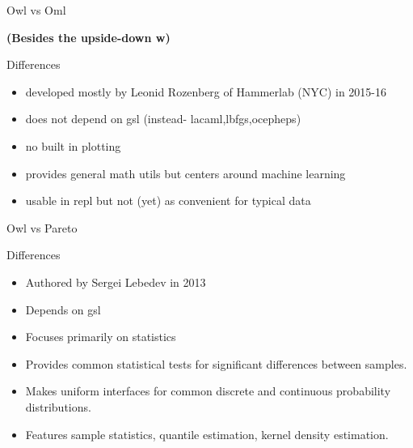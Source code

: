 \documentclass{beamer}
\begin{document}
\begin{frame}{Owl vs Oml}
\begin{block}{\textbf{(Besides the upside-down w)}}

\end{block}
\begin{block}{Differences}
\begin{itemize}
 \item developed mostly by Leonid Rozenberg of Hammerlab (NYC) in 2015-16 
 \item does not depend on gsl (instead- lacaml,lbfgs,ocepheps)
 \item no built in plotting
 \item provides general math utils but centers around machine learning
 \item usable in repl but not (yet) as convenient for typical data
\end{itemize}
\end{block}
\end{frame}

\begin{frame}{Owl vs Pareto}
\begin{block}{Differences}
\begin{itemize}
\item Authored by Sergei Lebedev in 2013
\item Depends on gsl
\item Focuses primarily on statistics
\item Provides common statistical tests for significant differences between samples.
\item Makes uniform interfaces for common discrete and continuous probability distributions.
\item Features sample statistics, quantile estimation, kernel density estimation.
\end{itemize}
\end{block}
\end{frame}
\end{document}
